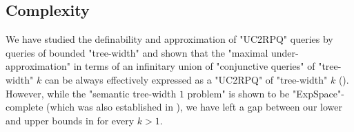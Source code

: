 

\subsection{Complexity}
\label{sec:discussion-stw-complexity}
We have studied the definability and approximation of "UC2RPQ" queries by queries of bounded "tree-width" and shown that the "maximal under-approximation" in terms of an infinitary union of "conjunctive queries" of "tree-width" $k$ can be always effectively expressed as a "UC2RPQ"
of "tree-width" $k$ (). 
However, while the "semantic tree-width $1$ problem" is shown to be "ExpSpace"-complete (which was also established in \cite[Theorem 6.1, Proposition 6.2]{BarceloRomeroVardi2016SemanticAcyclicity}), we have left a gap between our lower and upper bounds in  for every $k>1$.

